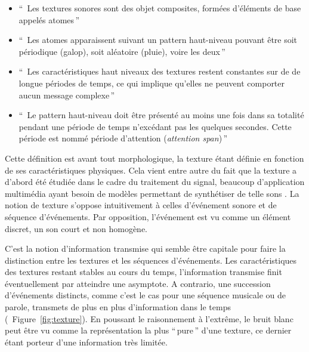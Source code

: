 \begin{itemize}
\item ``\, Les textures sonores sont des objet composites, formées d'éléments de base appelés atomes\,''
\item ``\, Les atomes apparaissent suivant un pattern haut-niveau pouvant être soit périodique (galop), soit aléatoire (pluie), voire les deux\,''
\item ``\, Les caractéristiques haut niveaux des textures restent constantes sur de de longue périodes de temps, ce qui implique qu'elles ne peuvent comporter aucun message complexe\,''
\item ``\, Le pattern haut-niveau doit être présenté au moins une fois dans sa totalité pendant une période de temps n’excédant pas les quelques  secondes. Cette période est nommé période d'attention (\emph{attention span})\,''
\end{itemize}

Cette définition est avant tout morphologique, la texture étant définie en fonction de ses caractéristiques physiques. Cela vient entre autre du fait que la texture a d'abord été étudiée dans le cadre du traitement du signal, beaucoup d'application multimédia ayant besoin de  modèles permettant de synthétiser de telle sons \citep{schwarz2011state}. La notion de texture s'oppose intuitivement à celles d'événement sonore et de séquence d'événements. Par opposition, l'événement est vu comme un élément discret, un son court et non homogène.

C'est la notion d'information transmise qui semble être capitale pour faire la distinction entre les textures et les séquences d'événements. Les caractéristiques des textures restant stables au cours du temps, l'information transmise finit éventuellement par atteindre une asymptote. A contrario, une succession d'événements distincts, comme c'est le cas pour une séquence musicale ou de parole, transmets de plus en plus d'information dans le temps (\Cf~Figure~\ref{fig:texture}). En poussant le raisonnement à l’extrême, le bruit blanc peut être vu comme la représentation la plus ``\,pure\,'' d'une texture, ce dernier étant porteur d'une information très limitée.

